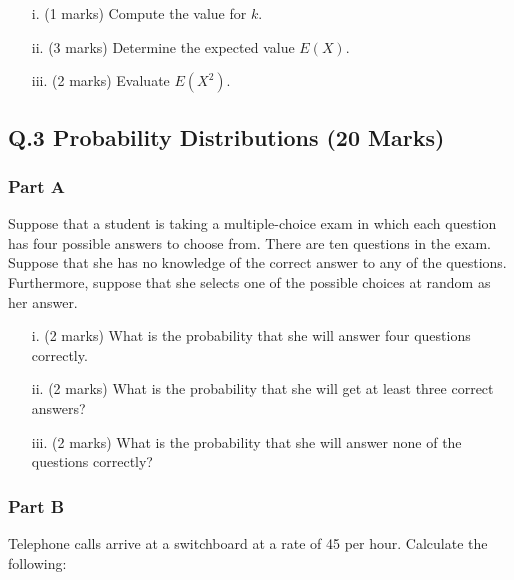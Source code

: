\documentclass[a4paper,12pt]{article}
\begin{document}
\begin{itemize}
\item[i.] (1 marks) Compute the value for $k$.
\item[ii.] (3 marks) Determine the expected value $E(X)$.
\item[iii.] (2 marks) Evaluate $E(X^2)$.
\end{itemize}



\newpage


\subsection*{Q.3 Probability Distributions (20 Marks)}

\subsubsection*{Part A} %
Suppose that a student is taking a multiple-choice exam in which each question has four possible answers to choose from. There are ten questions in the exam.
Suppose that she has no knowledge of the correct answer to any of the questions. Furthermore, suppose that she selects one of the possible choices at random as her answer.

\begin{itemize}
\item[i.] (2 marks)	What is the probability that she will answer four questions correctly.
\item[ii.] (2 marks) What is the probability that she will get at least three correct answers?
\item[iii.] (2 marks) What is the probability that she will answer none of the questions correctly?
\end{itemize}

\subsubsection*{Part B}%
Telephone calls arrive at a switchboard at a rate of 45 per hour. Calculate the following:
\end{document}
